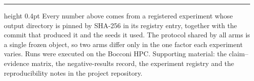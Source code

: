 \documentclass[11pt,a4paper]{article}
\begin{document}
\vspace{1.4em}
\hrule height 0.4pt
\vspace{0.7em}
\noindent
{\footnotesize Every number above comes from a registered experiment whose output directory is
pinned by SHA-256 in its registry entry, together with the commit that produced it and the seeds it
used. The protocol shared by all arms is a single frozen object, so two arms differ only in the one
factor each experiment varies. Runs were executed on the Bocconi HPC. Supporting material: the
claim--evidence matrix, the negative-results record, the experiment registry and the
reproducibility notes in the project repository.}
\end{document}
